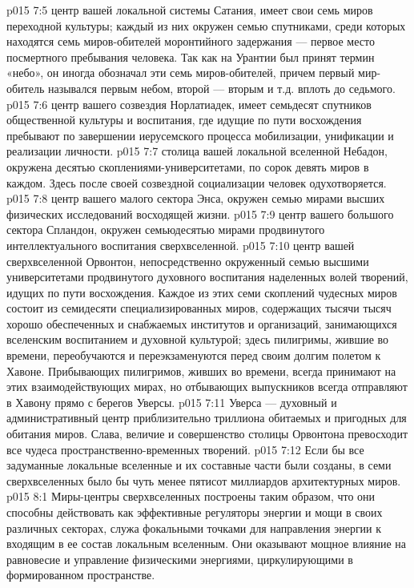 \vs p015 7:5 \pc {} центр вашей локальной системы Сатания, имеет свои семь миров переходной культуры; каждый из них окружен семью спутниками, среди которых находятся семь миров\hyp{}обителей моронтийного задержания --- первое место посмертного пребывания человека. Так как на Урантии был принят термин «небо», он иногда обозначал эти семь миров\hyp{}обителей, причем первый мир\hyp{}обитель назывался первым небом, второй --- вторым и т.д. вплоть до седьмого.
\vs p015 7:6 \pc {} центр вашего созвездия Норлатиадек, имеет семьдесят спутников общественной культуры и воспитания, где идущие по пути восхождения пребывают по завершении иерусемского процесса мобилизации, унификации и реализации личности.
\vs p015 7:7 \pc {} столица вашей локальной вселенной Небадон, окружена десятью скоплениями\hyp{}университетами, по сорок девять миров в каждом. Здесь после своей созвездной социализации человек одухотворяется.
\vs p015 7:8 \pc {} центр вашего малого сектора Энса, окружен семью мирами высших физических исследований восходящей жизни.
\vs p015 7:9 \pc {} центр вашего большого сектора Спландон, окружен семьюдесятью мирами продвинутого интеллектуального воспитания сверхвселенной.
\vs p015 7:10 \pc {} центр вашей сверхвселенной Орвонтон, непосредственно окруженный семью высшими университетами продвинутого духовного воспитания наделенных волей творений, идущих по пути восхождения. Каждое из этих семи скоплений чудесных миров состоит из семидесяти специализированных миров, содержащих тысячи тысяч хорошо обеспеченных и снабжаемых институтов и организаций, занимающихся вселенским воспитанием и духовной культурой; здесь пилигримы, жившие во времени, переобучаются и переэкзаменуются перед своим долгим полетом к Хавоне. Прибывающих пилигримов, живших во времени, всегда принимают на этих взаимодействующих мирах, но отбывающих выпускников всегда отправляют в Хавону прямо с берегов Уверсы.
\vs p015 7:11 Уверса --- духовный и административный центр приблизительно триллиона обитаемых и пригодных для обитания миров. Слава, величие и совершенство столицы Орвонтона превосходит все чудеса пространственно\hyp{}временных творений.
\vs p015 7:12 \pc Если бы все задуманные локальные вселенные и их составные части были созданы, в семи сверхвселенных было бы чуть менее пятисот миллиардов архитектурных миров.
\vs p015 8:1 Миры\hyp{}центры сверхвселенных построены таким образом, что они способны действовать как эффективные регуляторы энергии и мощи в своих различных секторах, служа фокальными точками для направления энергии к входящим в ее состав локальным вселенным. Они оказывают мощное влияние на равновесие и управление физическими энергиями, циркулирующими в формированном пространстве.
